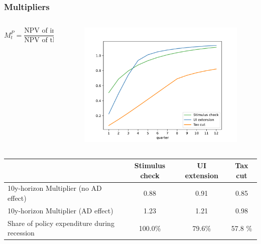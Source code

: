 \documentclass[pdflatex,aspectratio=169]{beamer}
\begin{document}
\begin{frame}
  \frametitle{Multipliers}

  \begin{columns}

    \begin{column}{0.50\textwidth}
      \begin{equation*}
        M^P_t = \frac{\text{NPV of induced consumption up to $t$}}{\text{NPV of the cost of the policy}}
      \end{equation*}
    \end{column}

    \begin{column}{0.50\textwidth}

      \begin{figure}[t]
        \centering
        \includegraphics[width=\linewidth]{Code/HA-Models/FromPandemicCode/Figures/Cumulative_multipliers}
      \end{figure}

    \end{column}
  \end{columns}

  \begin{table}[t]
    \begin{tabular}
      {@{}lccc@{}}
      \hline
                                                   & Stimulus check & UI extension & Tax cut \\  \hline
      10y-horizon Multiplier (no AD effect)        & 0.88           & 0.91         & 0.85    \\
      10y-horizon Multiplier (AD effect)           & 1.23           & 1.21         & 0.98    \\
      Share of policy expenditure during recession & 100.0\%        & 79.6\%       & 57.8 \% \\
    \end{tabular}
  \end{table}
\end{frame}
\end{document}
